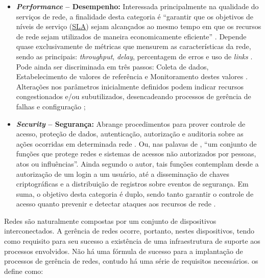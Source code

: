 \documentclass[twoside,english,brazilian]{UNISINOSmonografia}
\begin{document}
\begin{itemize}
		\item \textbf{\textit{Performance} -- Desempenho:}
Interessada principalmente na qualidade do serviços de rede, a finalidade 
desta categoria é ``garantir que os objetivos de níveis de serviço (\hyperref[siglas]{SLA}) sejam 
alcançados ao mesmo tempo em que os recursos de rede sejam utilizados de 
maneira economicamente eficiente'' \cite[p.~2]{Wang2012}.
Depende quase exclusivamente de métricas que mensurem as características da 
rede, sendo as principais: \textit{throughput}, \textit{delay}, percentagem de 
erros e uso de \textit{links} \cite{Clemm2006,Wang2012,Ding2009,Hunt1997}.
Pode ainda ser discriminada em três passos: Coleta de dados, Estabelecimento 
de valores de referência e Monitoramento destes valores \cite{Mauro2009}. 
Alterações nos parâmetros inicialmente definidos podem indicar recursos congestionados e/ou 
subutilizados, desencadeando processos de gerência de falhas e configuração 
\cite{Wang2012};

		\item \textbf{\textit{Security} -- Segurança:}
Abrange procedimentos para prover controle de acesso, proteção de dados, 
autenticação, autorização e auditoria sobre as ações ocorridas em determinada 
rede \cite{Wang2012}.
Ou, nas palavas de , ``um conjunto de funções que protege 
redes e sistemas de acessos não autorizados por pessoas, atos ou influências''.
Ainda segundo o autor, tais funções contemplam desde a autorização de um login a 
um usuário, até a disseminação de chaves criptográficas e a distribuição de 
registros sobre eventos de segurança.
Em suma, o objetivo desta categoria é duplo, sendo tanto garantir o controle 
de acesso quanto prevenir e detectar ataques aos recursos de rede 
\cite{Mauro2009}.

	\end{itemize}

Redes são naturalmente compostas por um conjunto de dispositivos 
interconectados. 
A gerência de redes ocorre, portanto, nestes dispositivos, tendo como 
requisito para seu sucesso a existência de uma infraestrutura de suporte aos 
processos envolvidos.
Não há uma fórmula de sucesso para a implantação de processos de gerência de 
redes, contudo há uma série de requisitos necessários. 
 os define como:
\end{document}
